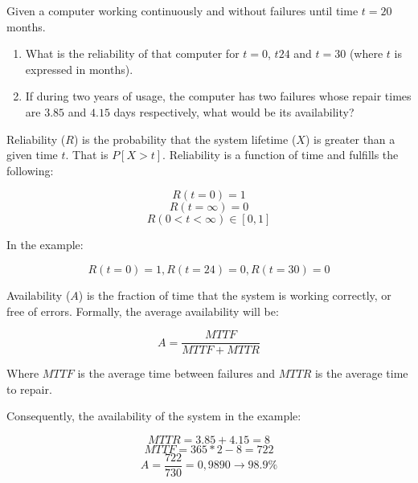 \begin{acexercise}\end{acexercise}

Given a computer working continuously and without failures until time $t=20$ months.

\begin{enumerate}

\item What is the reliability of that computer for $t=0$, $t24$ and $t=30$ (where $t$ is expressed in months).

\item If during two years of usage, the computer has two failures whose repair times are $3.85$ and $4.15$ days respectively, what would be its availability?

\end{enumerate}

\begin{acsolution}\end{acsolution}

Reliability ($R$) is the probability that the system lifetime ($X$)
is greater than a given time $t$. That is $P[X>t]$.
Reliability is a function of time and fulfills the following:

\[ R(t=0)=1 \]
\[ R(t=\infty)=0 \]
\[ R(0<t<\infty) \in [0,1] \]

In the example:

\[ R(t=0)=1, R(t=24)=0, R(t=30)=0 \]

Availability ($A$) is the fraction of time that the system is working correctly, or free of errors.
Formally, the average availability will be:

\[
A=\frac{MTTF}{MTTF+MTTR}
\]

Where $MTTF$ is the average time between failures and $MTTR$ is the average time to repair.

Consequently, the availability of the system in the example:

\[ MTTR=3.85+4.15=8 \]
\[ MTTF=365*2-8=722 \]
\[ A=\frac{722}{730}= 0,9890 \rightarrow 98.9\% \]

